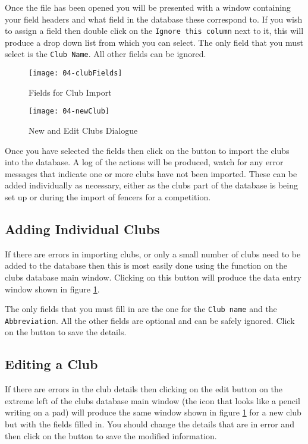 \documentclass[a4paper,11pt]{memoir}
\begin{document}
Once the file has been opened you will be presented with a window containing your field headers and what field in the database these correspond to. If you wish to assign a field then double click on the \texttt{Ignore this column} next to it, this will produce a drop down list from which you can select. The only field that you must select is the \texttt{Club Name}. All other fields can be ignored.

\begin{figure}[!ht]
 \begin{minipage}{0.4\textwidth}
  \centering
  \texttt{[image: 04-clubFields]}
  \caption{Fields for Club Import} \label{fig:04-clubFields}
 \end{minipage}
 \hfill
 \begin{minipage}{0.4\textwidth}
  \centering
  \texttt{[image: 04-newClub]}
  \caption{New and Edit Clubs Dialogue} \label{fig:04-newClub}
 \end{minipage}
\end{figure}

Once you have selected the fields then click on the  button to import the clubs into the database. A log of the actions will be produced, watch for any error messages that indicate one or more clubs have not been imported. These can be added individually as necessary, either as the clubs part of the database is being set up or during the import of fencers for a competition.

\subsection{Adding Individual Clubs}
If there are errors in importing clubs, or only a small number of clubs need to be added to the database then this is most easily done using the  function on the clubs database main window. Clicking on this button will produce the data entry window shown in figure \ref{fig:04-newClub}.

The only fields that you must fill in are the one for the \texttt{Club name} and the \texttt{Abbreviation}. All the other fields are optional and can be safely ignored. Click on the  button to save the details.

\subsection{Editing a Club}

If there are errors in the club details then clicking on the edit button on the extreme left of the clubs database main window (the icon that looks like a pencil writing on a pad) will produce the same window shown in figure \ref{fig:04-newClub} for a new club but with the fields filled in. You should change the details that are in error and then click on the  button to save the modified information.
\end{document}
